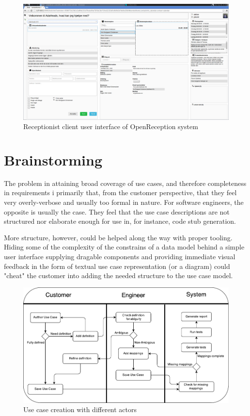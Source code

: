 \documentclass[10pt]{scrreprt}
\begin{document}
\begin{figure}
  \includegraphics[scale=0.2]{img/openreception-client-ui.png}
  \caption{Receptionist client user interface of OpenReception system}
  \label{fig:openreception-client-ui}
\end{figure}

\section{Brainstorming}
The problem in attaining broad coverage of use cases, and therefore completeness in requirements i primarily that, from the customer perspective, that they feel very overly-verbose and usually too formal in nature. For software engineers, the opposite is usually the case. They feel that the use case descriptions are not structured nor elaborate enough for use in, for instance, code stub generation.

More structure, however, could be helped along the way with proper tooling. Hiding some of the complexity of the constrains of a data model behind a simple user interface supplying dragable components and providing immediate visual feedback in the form of textual use case representation (or a diagram) could "cheat" the customer into adding the needed structure to the use case model.

\begin{figure}[h]
\includegraphics[scale=0.9]{img/use_case_creation_activity_diagram}
\centering
\caption{Use case creation with different actors}
\label{fig:use_case_creation_activity_diagram}
\end{figure}
\end{document}
